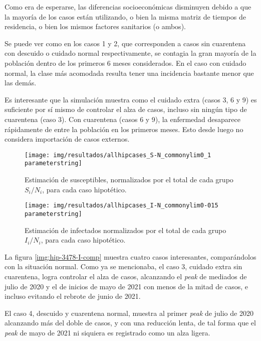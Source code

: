 Como era de esperarse, las diferencias socioeconómicas disminuyen debido a que la mayoría de los casos están utilizando, o bien la misma matriz de tiempos de residencia, o bien los mismos factores sanitarios (o ambos).

Se puede ver como en los casos 1 y 2, que corresponden a casos sin cuarentena con descuido o cuidado normal respectivamente, se contagia la gran mayoría de la población dentro de los primeros 6 meses considerados. En el caso con cuidado normal, la clase más acomodada resulta tener una incidencia bastante menor que las demás.

Es interesante que la simulación muestra como el cuidado extra (casos 3, 6 y 9) es suficiente por sí mismo de controlar el alza de casos, incluso sin ningún tipo de cuarentena (caso 3). Con cuarentena (casos 6 y 9), la enfermedad desaparece rápidamente de entre la población en los primeros meses. Esto desde luego no considera importación de casos externos.

\begin{figure}[h]
\centering
\texttt{[image: img/resultados/allhipcases\_S-N\_commonylim0\_1\\parameterstring]}
\caption{Estimación de susceptibles, normalizados por el total de cada grupo \(S_i/N_i\), para cada caso hipotético.}
\label{img:all-hip-S-N}
\end{figure}

\begin{figure}[h]
\centering
\texttt{[image: img/resultados/allhipcases\_I-N\_commonylim0-015\\parameterstring]}
\caption{Estimación de infectados normalizados por el total de cada grupo \(I_i/N_i\), para cada caso hipotético.}
\label{img:all-hip-I-N}
\end{figure}

La figura \ref{img:hip-3478-I-comp} muestra cuatro casos interesantes, comparándolos con la situación normal. Como ya se mencionaba, el caso 3, cuidado extra sin cuarentena, logra controlar el alza de casos, alcanzando el \textit{peak} de mediados de julio de 2020 y el de inicios de mayo de 2021 con menos de la mitad de casos, e incluso evitando el rebrote de junio de 2021.

El caso 4, descuido y cuarentena normal, muestra al primer \textit{peak} de julio de 2020 alcanzando más del doble de casos, y con una reducción lenta, de tal forma que el \textit{peak} de mayo de 2021 ni siquiera es registrado como un alza ligera.

